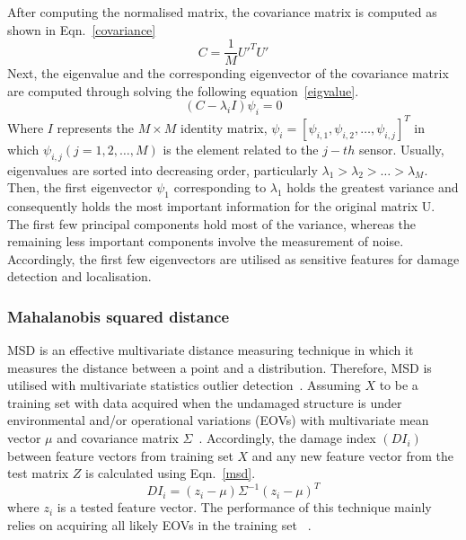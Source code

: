 After computing the normalised matrix, the covariance matrix is computed as shown in Eqn.~\ref{covariance}
\begin{equation}
	C = \frac{1}{M}U'^TU'
	\label{covariance}
\end{equation}
Next, the eigenvalue and the corresponding eigenvector of the covariance matrix are computed through solving the following equation~\ref{eigvalue}.
\begin{equation}
	(C-\lambda_iI)\psi_i =0
	\label{eigvalue}
\end{equation}
Where \(I\) represents the \(M\times M\) identity matrix, \(\psi_i = [\psi_{i,1},\psi_{i,2}, \hdots, \psi_{i,j}]^T\) in which \(\psi_{i,j}(j=1, 2, \hdots, M)\) is the element related to the \(j-th\) sensor.
Usually, eigenvalues are sorted into decreasing order, particularly \(\lambda_1>\lambda_2>\hdots>\lambda_M\). 
Then, the first eigenvector \(\psi_1\) corresponding to \(\lambda_1\) holds the greatest variance and consequently holds the most important information for the original matrix U. 
The first few principal components hold most of the variance, whereas the remaining less important components involve the measurement of noise.
Accordingly, the first few eigenvectors are utilised as sensitive features for damage detection and localisation.
\subsubsection{Mahalanobis squared distance}
MSD is an effective multivariate distance measuring technique in which it measures the distance between a point and a distribution.
Therefore, MSD is utilised with multivariate statistics outlier detection~\cite{Worden2000}.
Assuming \(X\) to be a training set with data acquired when the undamaged structure is under environmental and/or operational variations (EOVs) with multivariate mean vector \(\mu\) and covariance matrix \(\Sigma\)~\cite{Farrar2013}.
Accordingly, the damage index \((DI_i)\) between feature vectors from training set \(X\) and any new feature vector from the test matrix \(Z\) is calculated using Eqn.~\ref{msd}.
\begin{equation}
	DI_i = (z_i-\mu)\Sigma^{-1}(z_i-\mu)^T
	\label{msd}
\end{equation}
where \(z_i\) is a tested feature vector.
The performance of this technique mainly relies on acquiring all likely EOVs in the training set~
\cite{Farrar2013}.
